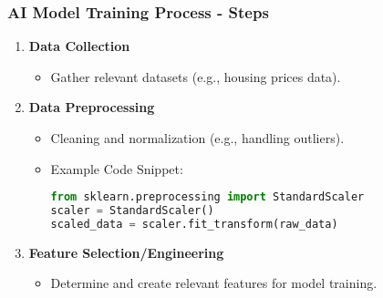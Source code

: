 \documentclass[aspectratio=169]{beamer}
\begin{document}
\begin{frame}[fragile]
    \frametitle{AI Model Training Process - Steps}
    \begin{enumerate}
        \item \textbf{Data Collection}
            \begin{itemize}
                \item Gather relevant datasets (e.g., housing prices data).
            \end{itemize}

        \item \textbf{Data Preprocessing}
            \begin{itemize}
                \item Cleaning and normalization (e.g., handling outliers).
                \item Example Code Snippet:
                \begin{lstlisting}[language=Python]
from sklearn.preprocessing import StandardScaler
scaler = StandardScaler()
scaled_data = scaler.fit_transform(raw_data)
                \end{lstlisting}
            \end{itemize}

        \item \textbf{Feature Selection/Engineering}
            \begin{itemize}
                \item Determine and create relevant features for model training.
            \end{itemize}
    \end{enumerate}
\end{frame}
\end{document}
